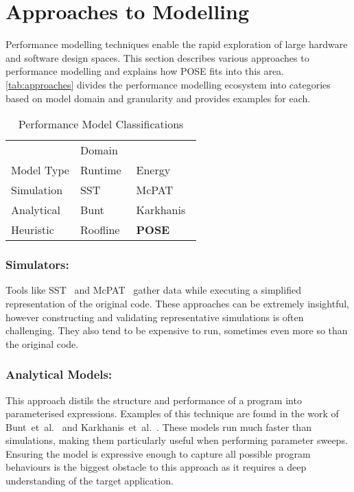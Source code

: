 \section{Approaches to Modelling}
\label{sec:approaches}
Performance modelling techniques enable the rapid exploration of large hardware and software design spaces.
This section describes various approaches to performance modelling and explains how POSE fits into this area.
\autoref{tab:approaches} divides the performance modelling ecosystem into categories based on model domain and granularity and provides examples for each.

\begin{table}
  \centering
  \caption{Performance Model Classifications}
  \setlength{\tabcolsep}{10pt}
  \begin{tabular}{lll}
  \toprule
    & \multicolumn{2}{l}{Domain}\\ \cmidrule(){2-3}
  Model Type  & Runtime & Energy \\
    \midrule
  Simulation & SST~\cite{rodrigues:2011aa} & McPAT~\cite{li:2009aa}  \\
  Analytical & Bunt~\cite{bunt:2013aa} & Karkhanis~\cite{karkhanis:2007aa} \\
  Heuristic & Roofline~\cite{williams:2009aa} & \textbf{POSE} \\
  \bottomrule
  \end{tabular}
  \label{tab:approaches}
\end{table}

\subsubsection{Simulators:} 
Tools like SST~\cite{rodrigues:2011aa} and McPAT~\cite{li:2009aa} gather data while executing a simplified representation of the original code.
These approaches can be extremely insightful, however constructing and validating representative simulations is often challenging.
They also tend to be expensive to run, sometimes even more so than the original code.

\subsubsection{Analytical Models:} This approach distils the structure and performance of a program into parameterised expressions.
Examples of this technique are found in the work of Bunt~et~al.~\cite{bunt:2013aa} and Karkhanis~et~al.~\cite{karkhanis:2007aa}.
These models run much faster than simulations, making them particularly useful when performing parameter sweeps.
Ensuring the model is expressive enough to capture all possible program behaviours is the biggest obstacle to this approach as it requires a deep understanding of the target application.

